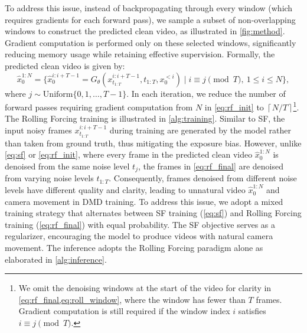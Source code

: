 To address this issue, instead of backpropagating through every window (which requires gradients for each forward pass), we sample a subset of non-overlapping windows to construct the predicted clean video, as illustrated in \cref{fig:method}. Gradient computation is performed only on these selected windows, significantly reducing memory usage while retaining effective supervision. Formally, the predicted clean video is given by:
\begin{equation}
\label{eq:rf_final}
    \hat{x}_0^{1:N} = \Big\{ \hat{x}^{i:i+T-1}_0 = 
    G_\theta(x^{i:i+T-1}_{t_{1:T}}, t_{1:T},  x^{<i}_0) \mid 
    i \equiv j \pmod{T},\ 1 \leq i \leq N
    \Big\}, 
\end{equation}
where $j \sim \text{Uniform}\{0,1,\dots,T-1\}$. In each iteration, we reduce the number of forward passes requiring gradient computation from $N$ in \cref{eq:rf_init} to $\left\lceil N/T \right\rceil$\footnote{We omit the denoising windows at the start of the video for clarity in \cref{eq:rf_final,eq:roll_window}, where the window has fewer than $T$ frames. Gradient computation is still required if the window index $i$ satisfies $i \equiv j \pmod{T}$.}. The Rolling Forcing training is illustrated in \cref{alg:training}. Similar to SF, the input noisy frames $x^{i:i+T-1}_{t_{1:T}}$ during training are generated by the model rather than taken from ground truth, thus mitigating the exposure bias. However, unlike \cref{eq:sf} or \cref{eq:rf_init}, where every frame in the predicted clean video $\hat{x}_0^{1:N}$ is denoised from the same noise level $t_j$, the frames in \cref{eq:rf_final} are denoised from varying noise levels $t_{1:T}$. Consequently, frames denoised from different noise levels have different quality and clarity, leading to unnatural video $\hat{x}_0^{1:N}$ and camera movement in DMD training. To address this issue, we adopt a mixed training strategy that alternates between SF training (\cref{eq:sf}) and Rolling Forcing training (\cref{eq:rf_final}) with equal probability. The SF objective serves as a regularizer, encouraging the model to produce videos with natural camera movement. The inference adopts the Rolling Forcing paradigm alone as elaborated in \cref{alg:inference}.



